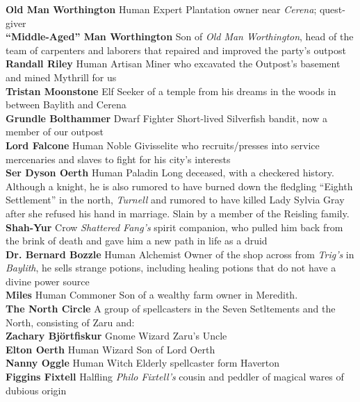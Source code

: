 \documentclass[letterpaper]{article}
\newcommand{\person}[3]{\noindent\textbf{#1
    \ifstrequal{#2}{M}{{\color{ProcessBlue}\male}}{%
    \ifstrequal{#2}{F}{\color{VioletRed}\female}{}}}{\scriptsize #3}}
\begin{document}
\person{Old Man Worthington}{M}{Human Expert} Plantation owner near \emph{Cerena}; quest-giver \\
\person{``Middle-Aged'' Man Worthington}{M}{} Son of \emph{Old Man Worthington}, head of the team of carpenters and laborers that repaired and improved the party's outpost \\
\person{Randall Riley}{M}{Human Artisan} Miner who excavated the Outpost's basement and mined Mythrill for us \\
\person{Tristan Moonstone}{M}{Elf} Seeker of a temple from his dreams in the woods in between Baylith and Cerena \\
\person{Grundle Bolthammer}{F}{Dwarf Fighter} Short-lived Silverfish bandit, now a member of our outpost\\
\person{Lord Falcone}{M}{Human Noble} Givisselite who recruits/presses into service mercenaries and slaves to fight for his city's interests\\
\person{Ser Dyson Oerth}{M}{Human Paladin} Long deceased, with a checkered history. Although a knight, he is also rumored to  have burned down the fledgling ``Eighth Settlement'' in the north, \emph{Turnell} and rumored to have killed Lady Sylvia Gray after she refused his hand in marriage. Slain by a member of the Reisling family.\\
\person{Shah-Yur}{M}{Crow} \emph{Shattered Fang's} spirit companion, who pulled him back from the brink of death and gave him a new path in life as a druid\\
\person{Dr. Bernard Bozzle}{M}{Human Alchemist} Owner of the shop across from \emph{Trig's} in \emph{Baylith}, he sells strange potions, including healing potions that do not have a divine power source\\
\person{Miles}{M}{Human Commoner} Son of a wealthy farm owner in Meredith. \\
\noindent\textbf{The North Circle} A group of spellcasters in the Seven Setltements and the North, consisting of Zaru and: \\
\indent\person{Zachary Bj\"{o}rtfiskur}{M}{Gnome Wizard} Zaru's Uncle \\
\indent\person{Elton Oerth}{M}{Human Wizard} Son of Lord Oerth \\
\indent\person{Nanny Oggle}{F}{Human Witch} Elderly spellcaster form Haverton \\
\indent\person{Figgins Fixtell}{M}{Halfling} \emph{Philo Fixtell's} cousin and peddler of magical wares of dubious origin \\
\end{document}
